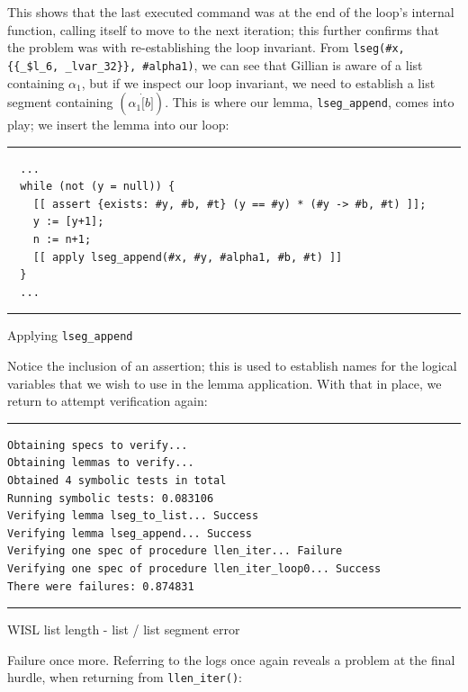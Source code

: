 This shows that the last executed command was at the end of the loop's internal
function, calling itself to move to the next iteration; this further confirms
that the problem was with re-establishing the loop invariant. From
\texttt{lseg(\#x, \{\{\_\$l\_6, \_lvar\_32\}\}, \#alpha1)}, we can see that Gillian
is aware of a list containing $\alpha_1$, but if we inspect our loop invariant,
we need to establish a list segment containing $(\alpha_1 \dot [b])$. This is
where our lemma, \texttt{lseg\_append}, comes into play; we insert the lemma
into our loop:
\begin{listing}[!ht]
\noindent\rule{\textwidth}{0.5pt}
\vspace{-0.6cm}
\begin{verbatim}
  ...
  while (not (y = null)) {
    [[ assert {exists: #y, #b, #t} (y == #y) * (#y -> #b, #t) ]];
    y := [y+1];
    n := n+1;
    [[ apply lseg_append(#x, #y, #alpha1, #b, #t) ]]
  }
  ...
\end{verbatim}
\vspace{-0.4cm}
\noindent\rule{\textwidth}{0.5pt}
\vspace{-0.6cm}
\caption{Applying \texttt{lseg\_append}}
\end{listing}

Notice the inclusion of an assertion; this is used to establish names for the
logical variables that we wish to use in the lemma application. With that in
place, we return to attempt verification again:

\begin{listing}[!ht]
\noindent\rule{\textwidth}{0.5pt}
\vspace{-0.6cm}
\begin{verbatim}
Obtaining specs to verify...
Obtaining lemmas to verify...
Obtained 4 symbolic tests in total
Running symbolic tests: 0.083106
Verifying lemma lseg_to_list... Success
Verifying lemma lseg_append... Success
Verifying one spec of procedure llen_iter... Failure
Verifying one spec of procedure llen_iter_loop0... Success
There were failures: 0.874831
\end{verbatim}
\vspace{-0.4cm}
\noindent\rule{\textwidth}{0.5pt}
\vspace{-0.6cm}
\caption{WISL list length - list / list segment error}
\end{listing}

Failure once more. Referring to the logs once again reveals a problem at the
final hurdle, when returning from \texttt{llen\_iter()}:

